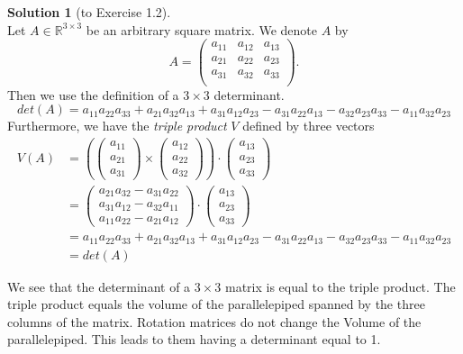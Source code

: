 \documentclass[11pt,english,paper=a4]{scrartcl}
\theoremstyle{definition} %
\newtheorem*{Solution}{Solution}
\newcommand{\R}{\mathbb{R}}
\begin{document}
\begin{Solution}[to Exercise 1.2]\ \\
	Let $A \in \R^{3\times3}$ be an arbitrary square matrix. We denote $A$ by 
	\begin{equation}A = 
		\begin{pmatrix}
		a_{11} & a_{12} & a_{13} \\
		a_{21} & a_{22} & a_{23} \\
		a_{31} & a_{32} & a_{33} \\
		\end{pmatrix}.
	\end{equation}
	Then we use the definition of a $3\times3$ determinant.
	\begin{equation*}
		det(A) = a_{11}a_{22}a_{33} + a_{21}a_{32}a_{13} + a_{31}a_{12}a_{23} - a_{31}a_{22}a_{13} - a_{32}a_{23}a_{33} - a_{11}a_{32}a_{23}
	\end{equation*}
	Furthermore, we have the \emph{triple product} $V$ defined by three vectors
	\begin{align*}
	V(A) &= 
		\left(\begin{pmatrix}	
			a_{11} \\
			a_{21} \\
			a_{31}
		\end{pmatrix} \times
		\begin{pmatrix}	
		a_{12} \\
		a_{22} \\
		a_{32}
		\end{pmatrix}\right) \cdot
		\begin{pmatrix}	
		a_{13} \\
		a_{23} \\
		a_{33}
		\end{pmatrix} \\
		&= 
		\begin{pmatrix}
			a_{21}a_{32} - a_{31}a_{22} \\
			a_{31}a_{12} - a_{32}a_{11} \\
			a_{11}a_{22} - a_{21}a_{12} 
		\end{pmatrix} \cdot
		\begin{pmatrix}
			a_{13} \\
			a_{23} \\
			a_{33}
		\end{pmatrix}\\
		&=a_{11}a_{22}a_{33} + a_{21}a_{32}a_{13} + a_{31}a_{12}a_{23} - a_{31}a_{22}a_{13} - a_{32}a_{23}a_{33} - a_{11}a_{32}a_{23}\\
		&= det(A)
	\end{align*}
	
	We see that the determinant of a $3\times 3$ matrix is equal to the triple product. The triple product equals the volume of the parallelepiped spanned by the three columns of the matrix. Rotation matrices do not change the Volume of the parallelepiped. This leads to them having a determinant equal to 1. 
\end{Solution}


\newpage


\end{document}
